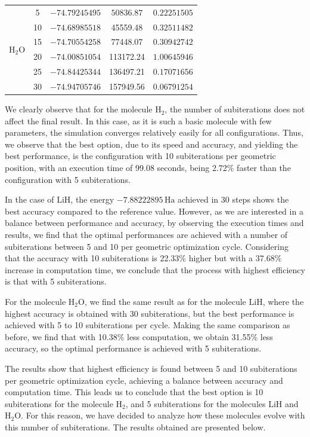 \begin{table}[H]
\begin{scriptsize}
\begin{tabular}{lcccc}
  \midrule
  \multirow{6}{*}{\(\mathrm{H_2O}\)} 
  & 5  & \(-74.79245495\) & \(\mathbf{50836.87}\) & \(0.22251505\) \\
  & 10 & \(-74.68985518\) & 45559.48 & \(0.32511482\) \\
  & 15 & \(-74.70554258\) & 77448.07 & \(0.30942742\) \\
  & 20 & \(-74.00851054\) & 113172.24 & \(1.00645946\) \\
  & 25 & \(-74.84425344\) & 136497.21 & \(0.17071656\) \\
  & 30 & \(\mathbf{-74.94705746}\) & 157949.56 & \(\mathbf{0.06791254}\) \\
  \bottomrule
  \end{tabular}
  \end{scriptsize}
\end{table}

  
We clearly observe that for the molecule \(\mathrm{H_2}\), the number of subiterations does not affect the final result. In this case, as it is such a basic molecule with few parameters, the simulation converges relatively easily for all configurations. Thus, we observe that the best option, due to its speed and accuracy, and yielding the best performance, is the configuration with 10 subiterations per geometric position, with an execution time of 99.08 seconds, being 2.72\% faster than the configuration with 5 subiterations.

In the case of \(\mathrm{LiH}\), the energy \(-7.88222895\,\mathrm{Ha}\) achieved in 30 steps shows the best accuracy compared to the reference value. However, as we are interested in a balance between performance and accuracy, by observing the execution times and results, we find that the optimal performances are achieved with a number of subiterations between 5 and 10 per geometric optimization cycle. Considering that the accuracy with 10 subiterations is 22.33\% higher but with a 37.68\% increase in computation time, we conclude that the process with highest efficiency is that with 5 subiterations.

For the molecule \(\mathrm{H_2O}\), we find the same result as for the molecule \(\mathrm{LiH}\), where the highest accuracy is obtained with 30 subiterations, but the best performance is achieved with 5 to 10 subiterations per cycle. Making the same comparison as before, we find that with 10.38\% less computation, we obtain 31.55\% less accuracy, so the optimal performance is achieved with 5 subiterations.

The results show that highest efficiency is found between 5 and 10 subiterations per geometric optimization cycle, achieving a balance between accuracy and computation time. This leads us to conclude that the best option is 10 subiterations for the molecule \(\mathrm{H_2}\), and 5 subiterations for the molecules \(\mathrm{LiH}\) and \(\mathrm{H_2O}\). For this reason, we have decided to analyze how these molecules evolve with this number of subiterations. The results obtained are presented below.

